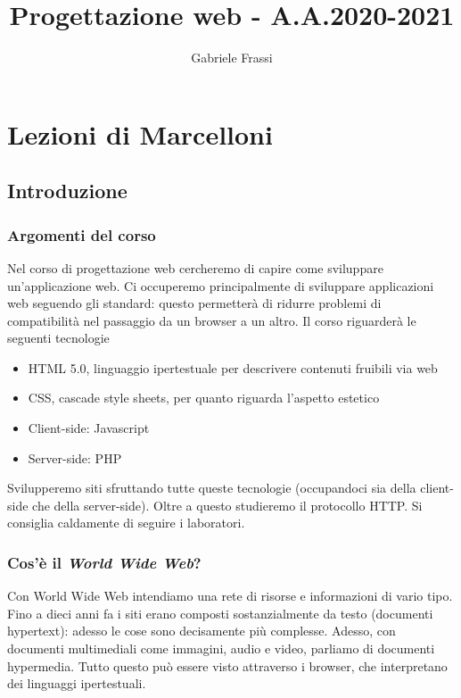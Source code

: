 \documentclass[11pt]{report}
\begin{document}
\renewcommand{\contentsname}{Indice degli appunti}
\title{\textbf{Progettazione web - A.A.2020-2021}}
\author{Gabriele Frassi}
\maketitle

\small\tableofcontents\normalsize

\part{Lezioni di Marcelloni}
\chapter{Introduzione}
\section*{Argomenti del corso}
Nel corso di progettazione web cercheremo di capire come sviluppare un'applicazione web. Ci occuperemo principalmente di sviluppare applicazioni web seguendo gli standard: questo permetterà di ridurre problemi di compatibilità nel passaggio da un browser a un altro. Il corso riguarderà le seguenti tecnologie
\begin{itemize}
\item HTML 5.0, linguaggio ipertestuale per descrivere contenuti fruibili via web
\item CSS, cascade style sheets, per quanto riguarda l'aspetto estetico
\item Client-side: Javascript
\item Server-side: PHP
\end{itemize}
Svilupperemo siti sfruttando tutte queste tecnologie (occupandoci sia della client-side che della server-side). Oltre a questo studieremo il protocollo HTTP. Si consiglia caldamente di seguire i laboratori.

\section*{Cos'è il \emph{World Wide Web}?}
Con World Wide Web intendiamo una rete di risorse e informazioni di vario tipo. Fino a dieci anni fa i siti erano composti sostanzialmente da testo (documenti hypertext): adesso le cose sono decisamente più complesse. Adesso, con documenti multimediali come immagini, audio e video, parliamo di documenti hypermedia. Tutto questo può essere visto attraverso i browser, che interpretano dei linguaggi ipertestuali. 
\end{document}
